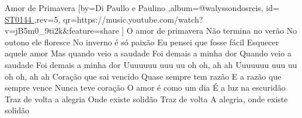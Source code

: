 \beginsong
{Amor de Primavera %
}[by={Di Paullo e Paulino %
},album={@walyssondosreis},
id={\href{https://music.youtube.com/watch?v=jB5m0_9ti2k&feature=share %
}{ ST0144 %
}},rev={5}, %
qr={https://music.youtube.com/watch?v=jB5m0_9ti2k&feature=share %
}]
\beginverse
O amor de primavera
Não termina no verão
No outono ele floresce
No inverno é só paixão
Eu pensei que fosse fácil
Esquecer aquele amor
Mas quando veio a saudade
Foi demais a minha dor
Quando veio a saudade
Foi demais a minha dor
\endverse
\beginchorus 
Uuuuuuu uuu uu oh oh, ah ah
Uuuuuuu uuu uu oh oh, ah ah
\endchorus
{}
\beginverse
Coração que sai vencido
Quase sempre tem razão
E a razão que sempre vence
Nunca teve coração
O amor é como um dia
É a luz na escuridão
Traz de volta a alegria
Onde existe solidão
Traz de volta
A alegria, onde existe solidão
\endverse
{}
\vspace{4em} %
\begin{comment}
\lstset{basicstyle=\scriptsize\bf} %
\tab{Solo 1}
\begin{lstlisting}
E|-----------------------------------------------------|
B|-----------------------------------------------------|
G|-----------------------------------------------------|
D|-----------------------------------------------------|
A|-----------------------------------------------------|
E|-----------------------------------------------------|
\end{lstlisting}
\end{comment}
\begin{comment}

\color{drawChord}\gtab{\color{nameChord} X}{}%
\color{drawChord}\gtab{\color{nameChord} X}{}%
\color{drawChord}\gtab{\color{nameChord} X}{}%
\color{drawChord}\gtab{\color{nameChord} X}{}%

\end{comment}
